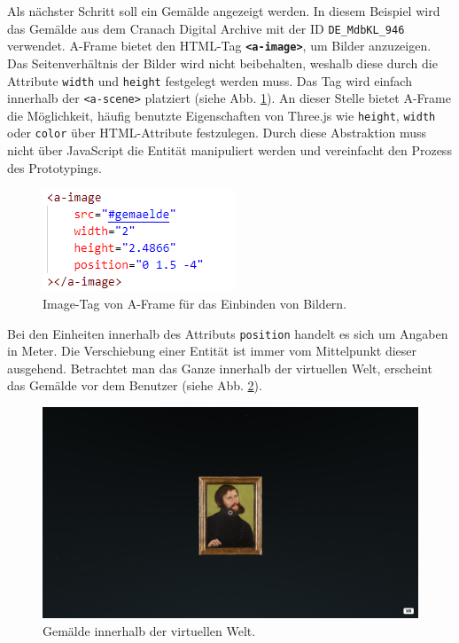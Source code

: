 \documentclass[a4paper,12pt,oneside]{article}
\begin{document}
        Als nächster Schritt soll ein Gemälde angezeigt werden. In diesem
        Beispiel wird das Gemälde aus dem Cranach Digital Archive
        mit der ID \texttt{DE\_MdbKL\_946} verwendet. A-Frame bietet 
        den HTML-Tag \texttt{\textbf{<a-image>}}, um Bilder anzuzeigen.
        Das Seitenverhältnis der Bilder wird nicht beibehalten, weshalb
        diese durch die Attribute \texttt{width} und \texttt{height} 
        festgelegt werden muss. Das Tag wird einfach innerhalb der
        \texttt{<a-scene>} platziert (siehe Abb. \ref{fig:a-image1}).
        An dieser Stelle bietet A-Frame die Möglichkeit, häufig benutzte
        Eigenschaften von Three.js wie \texttt{height}, \texttt{width}
        oder \texttt{color} über HTML-Attribute festzulegen. Durch diese
        Abstraktion muss nicht über JavaScript die Entität manipuliert
        werden und vereinfacht den Prozess des Prototypings.
        \begin{figure}[h]
          \centering
          \includegraphics{img/coding/a-image1.png}
          \caption{Image-Tag von A-Frame für das Einbinden von Bildern.}
          \label{fig:a-image1}
        \end{figure}
        Bei den Einheiten innerhalb des Attributs \texttt{position} handelt
        es sich um Angaben in Meter. Die Verschiebung einer Entität ist immer 
        vom Mittelpunkt dieser ausgehend. Betrachtet man das Ganze innerhalb der
        virtuellen Welt, erscheint das Gemälde vor dem Benutzer
        (siehe Abb. \ref{fig:vr-welt2}).
        \begin{figure}[h]
          \centering
          \includegraphics[scale=0.3]{img/coding/vr-welt2.png}
          \caption{Gemälde innerhalb der virtuellen Welt.}
          \label{fig:vr-welt2}
        \end{figure}
\end{document}
